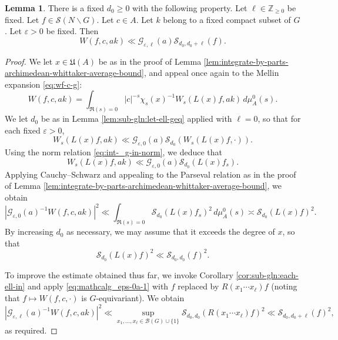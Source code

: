 \documentclass[reqno]{amsart}
\def\eps{\varepsilon}
\theoremstyle{plain} \newtheorem{theorem} {Theorem}
\theoremstyle{definition} \newtheorem{definition} [theorem] {Definition}
\theoremstyle{itplain} %
\newtheorem{lemma}[theorem]{Lemma}
\numberwithin{equation}{section}
\numberwithin{theorem}{section}
\renewcommand{\geq}{\geqslant}
\begin{document}
\begin{lemma}\label{lem:scratch-research:each-fixed-m}
  There is a fixed $d_0 \geq 0$ with the following property.  Let $\ell \in \mathbb{Z}_{\geq 0}$ be fixed.  Let $f \in \mathcal{S}(N \backslash G)$.  Let $c \in A$.  Let $k$ belong to a fixed compact subset of $G$.  Let $\eps > 0$ be fixed.  Then
  \begin{equation*}
    W(f,c,a k) \ll \mathcal{G}_{\eps,\ell}(a) \mathcal{S}_{d_0, d_0 + \ell}(f).
  \end{equation*}
\end{lemma}
\begin{proof}
  We let $x \in \mathfrak{U}(A)$ be as in the proof of Lemma \ref{lem:integrate-by-parts-archimedean-whittaker-average-bound}, and appeal once again to the Mellin expansion \eqref{eq:wf-c-g}:
  \begin{equation*}
    W(f,c,a k) =
    \int _{\Re(s) = 0}
    |c|^{-s} \chi_s(x)^{-1} W_s(L(x) f,a k) \, d \mu_A^0(s).
  \end{equation*}
  We let $d_0$ be as in Lemma \ref{lem:sub-gln:let-ell-geq} applied with $\ell = 0$, so that for each fixed $\eps > 0$,
  \begin{equation*}
    W_s(L(x) f, a k) \ll \mathcal{G}_{\eps,0}(a) \mathcal{S}_{d_0}(W_s(L(x) f, \cdot)).
  \end{equation*}
  Using the norm relation \eqref{eq:int-_g-in-norm}, we deduce that
  \begin{equation*}
    W_s(L(x) f, a k) \ll \mathcal{G}_{\eps,0}(a) \mathcal{S}_{d_0}(L(x) f_s).
  \end{equation*}
  Applying Cauchy--Schwarz and appealing to the Parseval relation as in the proof of Lemma \ref{lem:integrate-by-parts-archimedean-whittaker-average-bound}, we obtain
  \begin{equation}\label{eq:mathcalg_eps-0a-1}
    |\mathcal{G}_{\eps,0}(a)^{-1} W(f,c,a k)|^2 \ll 
    \int_{\Re(s) = 0}
    \mathcal{S}_{d_0}(L(x) f_s)^2 \, d \mu_A^0(s)
    \asymp
    \mathcal{S}_{d_0}(L(x) f)^2.
  \end{equation}
  By increasing $d_0$ as necessary, we may assume that it exceeds the degree of $x$, so that
  \begin{equation*}
    \mathcal{S}_{d_0}(L(x) f)^2 \ll \mathcal{S}_{d_0,d_0}(f)^2.
  \end{equation*}
  
  To improve the estimate obtained thus far, we invoke Corollary \ref{cor:sub-gln:each-ell-in} and apply \eqref{eq:mathcalg_eps-0a-1} with $f$ replaced by $R(x_1 \dotsb x_{\ell}) f$ (noting that $f \mapsto W(f,c,\cdot)$ is $G$-equivariant).  We obtain
  \begin{equation*}
        |\mathcal{G}_{\eps,\ell}(a)^{-1} W(f,c,a k)|^2 \ll
    \sup_{x_1,\dotsc,x_\ell \in \mathcal{B}(G) \cup \{1\}}
    \mathcal{S}_{d_0,d_0}(R(x_1 \dotsb x_{\ell}) f)^2
    \ll
    \mathcal{S}_{d_0, d_0 + \ell}(f)^2,
  \end{equation*}
  as required.
\end{proof}
\end{document}
